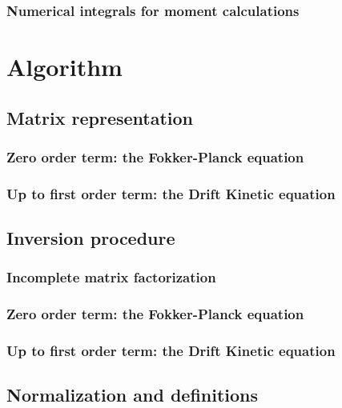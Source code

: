 \documentclass[11pt,a4paper]{report}
\begin{document}
		\subsection{Numerical integrals for moment calculations}
		

\chapter{Algorithm}

	\section{Matrix representation}

		\subsection{Zero order term: the Fokker-Planck equation}
		

		\subsection{Up to first order term: the Drift Kinetic equation}
		

	\section{Inversion procedure}

		\subsection{Incomplete matrix factorization}
		

		\subsection{Zero order term: the Fokker-Planck equation}
		

		\subsection{Up to first order term: the Drift Kinetic equation}
		

	\section{Normalization and definitions}
	
\end{document}
